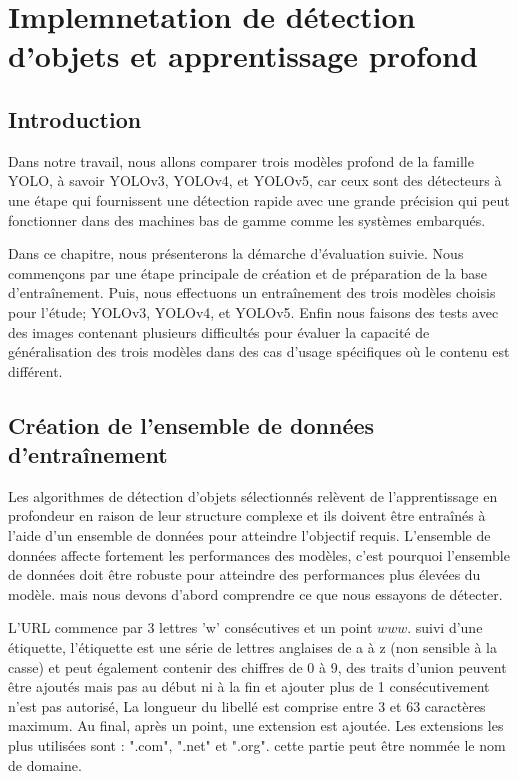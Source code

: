 \chapter{Implemnetation de détection d'objets et apprentissage profond}
\newpage
\pagestyle{fancy}
\fancyhead[L]{\chaptername \ \thechapter}
\renewcommand{\headrulewidth}{1pt}
\fancyfoot[C]{\thepage}

\section{Introduction} 
Dans notre travail, nous allons comparer trois modèles profond de la 
famille YOLO, à savoir YOLOv3, YOLOv4, et YOLOv5, car ceux sont des détecteurs à une étape qui fournissent une détection rapide avec une grande précision qui peut fonctionner dans des machines bas de gamme comme les systèmes embarqués.

Dans ce chapitre, nous présenterons la démarche d'évaluation suivie.
Nous commençons par une étape principale de création et de préparation de la base d'entraînement. Puis, nous effectuons un entraînement des trois modèles choisis pour l'étude; YOLOv3, YOLOv4, et YOLOv5. Enfin nous faisons des tests avec des images contenant plusieurs difficultés pour évaluer la capacité de généralisation des trois modèles dans des cas d'usage  spécifiques où le contenu est différent. 


\section{Création de l'ensemble de données d'entraînement}
Les algorithmes de détection d'objets sélectionnés relèvent de l'apprentissage en profondeur en raison de leur structure complexe et ils doivent être entraînés à l'aide d'un ensemble de données pour atteindre l'objectif requis. L'ensemble de données affecte fortement les performances des modèles, c'est pourquoi l'ensemble de données doit être robuste pour atteindre des performances plus élevées du modèle. mais nous devons d'abord comprendre ce que nous essayons de détecter.

          L'URL commence par 3 lettres 'w' consécutives et un point \(www.\) suivi d'une étiquette, l'étiquette est une série de lettres anglaises de a à z (non sensible à la casse) et peut également contenir des chiffres de 0 à 9, des traits d'union peuvent être ajoutés mais pas au début ni à la fin et ajouter plus de 1 consécutivement n'est pas autorisé, La longueur du libellé est comprise entre 3 et 63 caractères maximum. Au final, après un point, une extension est ajoutée. Les extensions les plus utilisées sont : ".com", ".net" et ".org". cette partie peut être nommée le nom de domaine.

